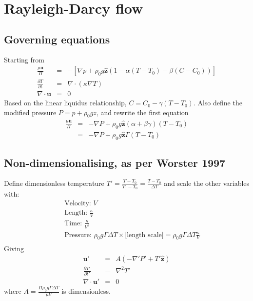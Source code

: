 \documentclass{article}
\begin{document}
\section{Rayleigh-Darcy flow}
\subsection{Governing equations}
Starting from
\begin{eqnarray}
\frac{\mu \mathbf{u}}{\Pi} &=& - \left[ \nabla p + \rho_0 g \mathbf{\hat{z}} \left(1 - \alpha (T-T_0) + \beta (C-C_0) \right) \right] \\
\frac{\partial T}{\partial t}&=&\nabla \cdot (\kappa \nabla T) \\
\nabla \cdot \mathbf{u} &=& 0
\end{eqnarray}
Based on the linear liquidus relationship, $C = C_0 - \gamma (T-T_0)$. Also define the modified pressure $P = p + \rho_0 g z$, and rewrite the first equation
\begin{eqnarray*}
\frac{\mu \mathbf{u}}{\Pi} &=& - \nabla P + \rho_0 g \mathbf{\hat{z}} (\alpha + \beta \gamma) (T-T_0) \\
&=& - \nabla P + \rho_0 g \mathbf{\hat{z}} \Gamma (T-T_0)
\end{eqnarray*}
\subsection{Non-dimensionalising, as per Worster 1997}
Define dimensionless temperature $T' = \frac{T - T_0}{T_1 - T_0} = \frac{T - T_0}{\Delta T}$ and scale the other variables with:
\begin{eqnarray*}
&&\text{Velocity: } V \\
&&\text{Length: } \frac{\kappa}{V} \\
&&\text{Time: } \frac{\kappa}{V^2}\\
&&\text{Pressure: } \rho_0 g \Gamma \Delta T \times \text{[length scale]} =  \rho_0 g \Gamma \Delta T \frac{\kappa}{V}\\
\end{eqnarray*}
Giving
\begin{eqnarray*}
\mathbf{u}' &=& A \left( -\nabla'P' + T'\mathbf{\hat{z}} \right) \\
\frac{\partial T'}{\partial t'} &=& \nabla^2 T' \\
\nabla \cdot \mathbf{u}' &=& 0
\end{eqnarray*}
where $A = \frac{\Pi \rho_0 g \Gamma \Delta T}{\mu V}$ is dimensionless.
\end{document}
